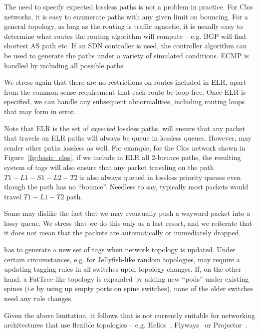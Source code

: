  The need to specify expected lossless paths is not a
problem in practice. For Clos networks, it is easy to enumerate paths with any
given limit on bouncing. For a general topology, as long as the routing is
traffic agnostic, it is usually easy to determine what routes the routing
algorithm will compute -- e.g. BGP will find shortest AS path etc.  If an
SDN controller is used, the controller algorithm can be used to generate the
paths under a variety of simulated conditions. ECMP is handled by including all possible
paths.

We stress again that there are no restrictions on routes included in ELR, apart
from the common-sense requirement that each route be loop-free. Once ELR is
specified, we can handle any subsequent abnormalities, including routing loops
that may form in error.

Note that ELR is the set of {\em expected} lossless paths. \sysname{} will
ensure that any packet that travels on ELR paths will always be queue in
lossless queues. However, \sysname{} may render other paths lossless as well.
For example, for the Clos network shown in Figure~\ref{fig:basic_clos}, if we
include in ELR all 2-bounce paths, the resulting system of tags will also ensure
that any packet traveling on the path $T1-L1-S1-L2-T2$ is also always queued in
lossless priority queues even though the path has no ``bounce''. Needless to
say, typically most packets would travel $T1-L1-T2$ path.

 Some may dislike the fact that we may eventually push
a wayward packet into a lossy queue. We stress that we do this only as a last
resort, and we reiterate that it does not mean that the packets are
automatically or immediately dropped.

 \sysname{} has to generate a new set of
tags when network topology is updated. Under certain circumstances, e.g.  for
Jellyfish-like random topologies, \sysname{} may require a updating tagging
rules in all switches upon topology changes.  If, on the other hand, a
FatTree-like topology is expanded by adding new ``pods'' under existing spines
(i.e by using up empty ports on spine switches), none of the older switches need
any rule changes.

 Given the above limitation, it follows that \sysname{}
is not currently suitable for networking architectures that use flexible
topologies -- e.g. Helios~\cite{helios}, Flyways~\cite{flyways} or
Projector~\cite{projector}.

